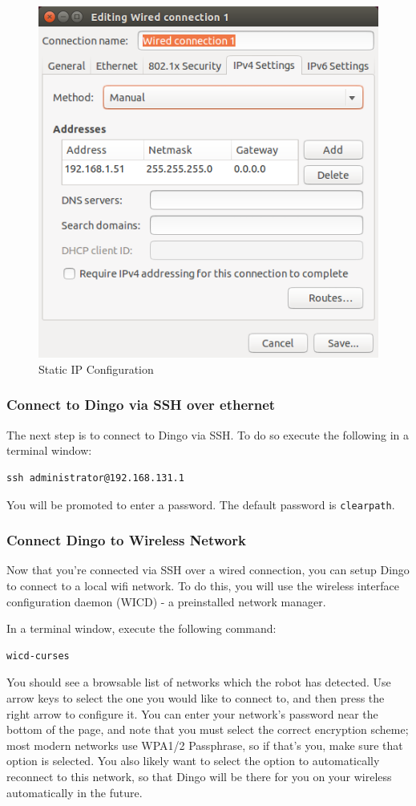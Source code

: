 \documentclass[]{clearpath-latex/clearpath-manual}
\begin{document}
\begin{figure}[H]
  \centering
  \includegraphics[width=0.5\linewidth]{wired_connection.png}
  \caption{Static IP Configuration}
  \label{staticip}
\end{figure}


\subsubsection{Connect to Dingo via SSH over ethernet}

The next step is to connect to Dingo via SSH.  To do so execute the following in a terminal window:

\begin{lstlisting}
ssh administrator@192.168.131.1
\end{lstlisting}

You will be promoted to enter a password.  The default password is \lstinline{clearpath}.

\subsubsection{Connect Dingo to Wireless Network}

Now that you're connected via SSH over a wired connection, you can setup Dingo to connect to a local wifi network.  To do this, you will use the wireless interface configuration daemon (WICD) - a preinstalled network manager.

In a terminal window, execute the following command:

\begin{lstlisting}
wicd-curses
\end{lstlisting}

You should see a browsable list of networks which the robot has detected. Use arrow keys to select the one you would like to connect to, and then press the right arrow to configure it. You can enter your network’s password near the bottom of the page, and note that you must select the correct encryption scheme; most modern networks use WPA1/2 Passphrase, so if that’s you, make sure that option is selected. You also likely want to select the option to automatically reconnect to this network, so that Dingo will be there for you on your wireless automatically in the future.
\end{document}
